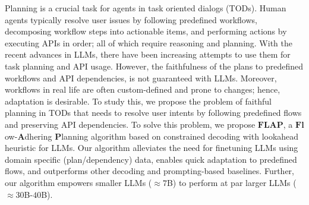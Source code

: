 Planning is a crucial task for agents in task oriented dialogs (TODs). Human agents typically resolve user issues by following predefined workflows, decomposing workflow steps into actionable items, and performing actions by executing APIs in order; all of which require reasoning and planning. With the recent advances in LLMs, there have been increasing attempts to use them for task planning and API usage. However, the faithfulness of the plans to predefined workflows and API dependencies, is not guaranteed with LLMs. Moreover, workflows in real life are often custom-defined and prone to changes; hence, adaptation is desirable. To study this, we propose the problem of faithful planning in TODs that needs to resolve user intents by following predefined flows and preserving API dependencies. To solve this problem, we propose $\textbf{FLAP}$, a $\textbf{Fl}$ow-$\textbf{A}$dhering $\textbf{P}$lanning algorithm based on constrained decoding with lookahead heuristic for LLMs. Our algorithm alleviates the need for finetuning LLMs using domain specific (plan/dependency) data, enables quick adaptation to predefined flows, and outperforms other decoding and prompting-based baselines. Further, our algorithm empowers smaller LLMs ($\approx7$B) to perform at par larger LLMs ($\approx30$B-$40$B).